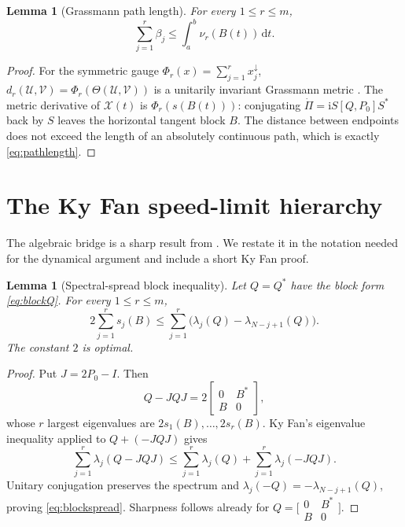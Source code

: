 \documentclass[11pt]{article}
\newtheorem{lemma}[theorem]{Lemma}
\theoremstyle{definition}
\theoremstyle{remark}
\newcommand{\dd}{\mathrm d}
\begin{document}
\begin{lemma}[Grassmann path length]\label{lem:path}
For every $1\leq r\leq m$,
\begin{equation}\label{eq:pathlength}
 \sum_{j=1}^r\beta_j\leq\int_a^b\nu_r(B(t))\,\dd t.
\end{equation}
\end{lemma}

\begin{proof}
For the symmetric gauge $\Phi_r(x)=\sum_{j=1}^r x_j^\downarrow$,
$d_r(\mathcal U,\mathcal V)=\Phi_r(\Theta(\mathcal U,\mathcal V))$ is a
unitarily invariant Grassmann metric \cite{QiuZhangLi2005}.  The metric
derivative of $\mathcal X(t)$ is $\Phi_r(s(B(t)))$: conjugating
$\dot\Pi=\mathrm iS[Q,P_0]S^*$ back by $S$ leaves the horizontal tangent
block $B$.  The distance between endpoints does not exceed the length of an
absolutely continuous path, which is exactly \eqref{eq:pathlength}.
\end{proof}

\section{The Ky Fan speed-limit hierarchy}

The algebraic bridge is a sharp result from
\cite[Theorem~2.7]{MasseyStojanoffZarate2021}.  We restate it in the notation
needed for the dynamical argument and include a short Ky Fan proof.

\begin{lemma}[Spectral-spread block inequality]\label{lem:block}
Let $Q=Q^*$ have the block form \eqref{eq:blockQ}.  For every
$1\leq r\leq m$,
\begin{equation}\label{eq:blockspread}
 2\sum_{j=1}^r s_j(B)
 \leq\sum_{j=1}^r\bigl(\lambda_j(Q)-\lambda_{N-j+1}(Q)\bigr).
\end{equation}
The constant $2$ is optimal.
\end{lemma}

\begin{proof}
Put $J=2P_0-I$.  Then
\[
 Q-JQJ=2\begin{bmatrix}0&B^*\\B&0\end{bmatrix},
\]
whose $r$ largest eigenvalues are $2s_1(B),\ldots,2s_r(B)$.
Ky Fan's eigenvalue inequality \cite{Fan1951} applied to
$Q+(-JQJ)$ gives
\[
 \sum_{j=1}^r\lambda_j(Q-JQJ)
 \leq\sum_{j=1}^r\lambda_j(Q)+\sum_{j=1}^r\lambda_j(-JQJ).
\]
Unitary conjugation preserves the spectrum and
$\lambda_j(-Q)=-\lambda_{N-j+1}(Q)$, proving \eqref{eq:blockspread}.
Sharpness follows already for $Q=\bigl[\begin{smallmatrix}0&B^*\\B&0\end{smallmatrix}\bigr]$.
\end{proof}
\end{document}
